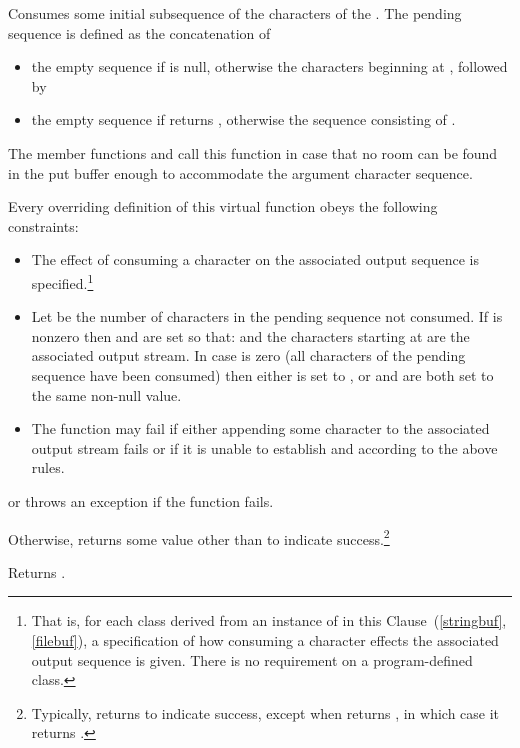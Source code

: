 \begin{itemdescr}
\pnum
\effects
Consumes some initial subsequence of the characters of the
.
The pending sequence is defined as the concatenation of
\begin{itemize}
\item
the empty sequence if  is null, otherwise the
characters beginning at
, followed by
\item
the empty sequence
if
returns
, otherwise the sequence consisting of .
\end{itemize}

\pnum
\remarks
The member functions
and
call this function in case that
no room can be found in the put buffer enough to accommodate the
argument character sequence.

\pnum
\expects
Every overriding definition of this virtual function
obeys the following constraints:
\begin{itemize}
\item
The effect of consuming a character on the associated output sequence is
specified.\footnote{That is, for each class derived from an instance of
in this Clause~(\ref{stringbuf},
\ref{filebuf}),
a specification of how consuming a character effects the associated output sequence is given.
There is no requirement on a program-defined class.}
\item
Let
be the number of characters in the pending sequence not consumed.
If
is nonzero then
and
are set so that:
and the  characters starting at
are the associated output stream.
In case   is zero (all characters of the pending sequence have been consumed)
then either
is set to
,
or
and
are both set to the same non-null value.
\item
The function may fail if either
appending some character to the associated output stream fails or
if it is unable to establish
and
according to the above rules.
\end{itemize}

\pnum
\returns
{}
or throws an exception
if the function fails.

Otherwise,
returns some value other than
to indicate success.\footnote{Typically,
returns  to indicate success, except when
returns
,
in which case it returns
.}

\pnum
{}
Returns
.
\end{itemdescr}

